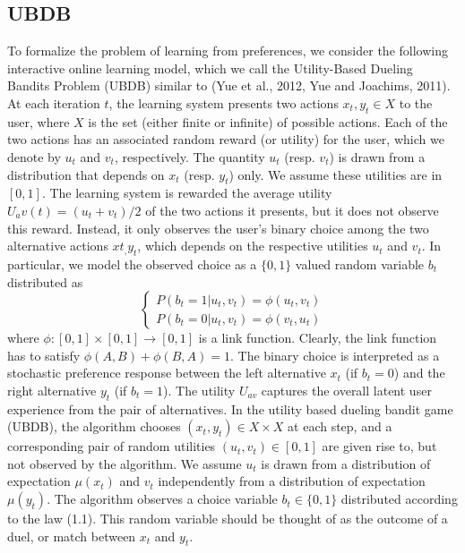 \documentclass{llncs}
\begin{document}
	\subsection{UBDB}
	To formalize the problem of learning from preferences, we consider the following interactive online learning model, which we call the Utility-Based Dueling Bandits Problem (UBDB) similar to (Yue et al., 2012, Yue and Joachims, 2011). 
		At each iteration $t$, the learning system presents two actions $x_t, y_t \in X$ to the user, where $X$ is the set (either finite or infinite) of possible actions. 
		Each of the two actions has an associated random reward (or utility) for the user, which we denote by $u_t$ and $v_t$, respectively.
		The quantity $u_t$ (resp. $v_t$) is drawn from a distribution that depends on $x_t$ (resp. $y_t$) only.  
		We assume these utilities are in $[0, 1]$. The learning system is rewarded the average utility$ U_av(t) = (u_t + v_t)/2$ of the two actions it presents, but it does not observe this reward. 
		Instead, it only observes the user’s binary choice among the two alternative actions $xt_, y_t$, which depends on the respective utilities $u_t$ and $v_t$. 
		In particular, we model the observed choice as a $\{0, 1\}$ valued random variable $b_t$ distributed as
		\begin{equation}
		\begin{cases}
		P(b_t = 1|u_t, v_t) = \phi(u_t, v_t)
		\\
		P(b_t = 0|u_t, v_t) = \phi(v_t, u_t)
		\end{cases}
		\end{equation}			
	where $\phi:[0, 1] \times [0, 1] \rightarrow [0, 1]$ is a link function. 
	Clearly, the link function has to satisfy $\phi(A, B) + \phi(B, A) = 1$.
	The binary choice is interpreted as a stochastic preference response between the left alternative $x_t$ (if $b_t = 0$) and the right alternative $y_t$ (if $b_t = 1$). 
	The utility $U_{av}$ captures the overall latent user experience from the pair of alternatives. 
	In the utility based dueling bandit game (UBDB), the algorithm chooses $(x_t, y_t) \in X \times X$ at each step, and a corresponding pair of random utilities $(u_t, v_t) \in [0, 1]$ are given rise to, but not observed by the algorithm.  
	We assume $u_t$ is drawn from a distribution of expectation $\mu(x_t)$ and $v_t$ independently from a distribution of expectation $\mu(y_t)$. 
	The algorithm observes a choice variable $b_t \in \{0, 1\}$ distributed according to the law (1.1). 
	This random variable should be thought of as the outcome of a duel, or match between $x_t$ and $y_t$. 
\end{document}
